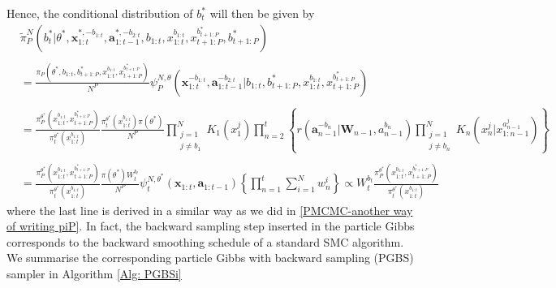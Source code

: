 \documentclass[12pt,a4paper]{article}
\begin{document}
Hence, the conditional distribution of $b_t^{*}$ will then be given by 
\begin{equation}
    \label{PMCMC-PGBS conditional}
    \begin{split}
        &\tilde{\pi}_P^{N}(b_t^{*}|\theta^{*},\textbf{x}_{1:t}^{*,-b_{1:t}},\textbf{a}_{1:t-1}^{*,-b_{2:t}},b_{1:t},x_{1:t}^{b_{1:t}},x_{t+1:P}^{b_{t+1:P}^{*}},b_{t+1:P}^{*}) \\\\
        &=\frac{\pi_P(\theta^{*},b_{1:t},b_{t+1:P}^{*},x_{1:t}^{b_{1:t}},x_{t+1:P}^{b_{t+1:P}^{*}})}{N^P}\psi_{P}^{N,\theta}(\mathbf{x}_{1:t}^{-b_{1:t}},\mathbf{a}_{1:t-1}^{-b_{2:t}}|b_{1:t},b_{t+1:P}^{*},x_{1:t}^{b_{1:t}},x_{t+1:P}^{b_{t+1:P}^{*}})\\\\
        &=\frac{\pi_P^{\theta^{*}}(x_{1:t}^{b_{1:t}},x_{t+1:P}^{b_{t+1:P}^{*}})}{\pi_t^{\theta^{*}}(x_{1:t}^{b_{1:t}})}\frac{\pi_t^{\theta^{*}}(x_{1:t}^{b_{1:t}})\pi(\theta^{*})}{N^P}\prod_{\substack{j=1\\j \neq b_1}}^{N} K_1\left(x_1^j\right)\prod_{n=2}^t \left\{r\left(\mathbf{a}_{n-1}^{-b_{n}}|\mathbf{W}_{n-1},a_{n-1}^{b_n}\right)\prod_{\substack{j=1\\ j \neq b_n}}^{N} K_n(x_n^j|x_{1:n-1}^{a_{n-1}^j})\right\}\\\\
        &=\frac{\pi_P^{\theta^{*}}(x_{1:t}^{b_{1:t}},x_{t+1:P}^{b_{t+1:P}^{*}})}{\pi_t^{\theta^{*}}(x_{1:t}^{b_{1:t}})}\frac{\pi(\theta^{*})W_t^{b_t}}{N^P}\psi_t^{N,\theta^{*}}(\mathbf{x}_{1:t},\mathbf{a}_{1:t-1})\left\{\prod_{n=1}^{t}\sum_{i=1}^N w_n^i\right\} \propto W_t^{b_t} \frac{\pi_P^{\theta^{*}}(x_{1:t}^{b_{1:t}},x_{t+1:P}^{b_{t+1:P}^{*}})}{\pi_t^{\theta^{*}}(x_{1:t}^{b_{1:t}})}
    \end{split} 
\end{equation}
where the last line is derived in a similar way as we did in \eqref{PMCMC-another way of writing piP}. In fact, the backward sampling step inserted in the particle Gibbs corresponds to the backward smoothing schedule of a standard SMC algorithm. We summarise the corresponding particle Gibbs with backward sampling (PGBS) sampler in Algorithm \ref{Alg: PGBSi}
\end{document}
